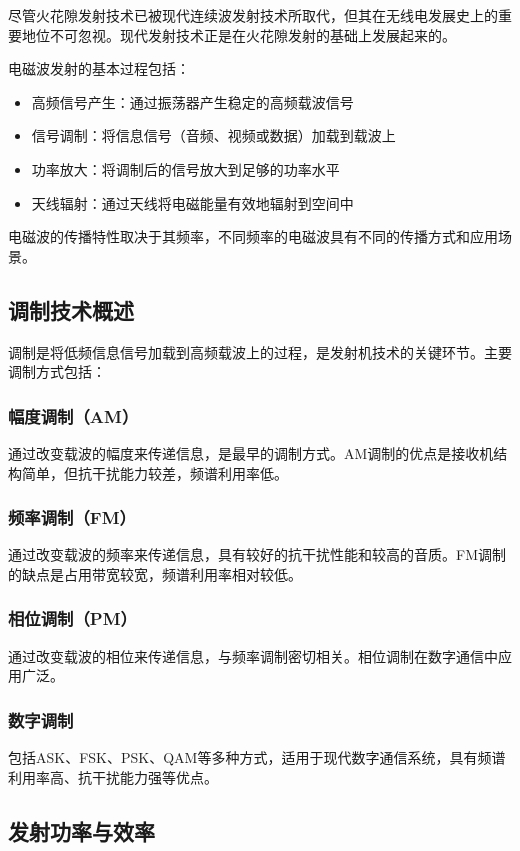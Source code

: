 \documentclass[12pt,UTF8]{ctexbook}
\begin{document}
尽管火花隙发射技术已被现代连续波发射技术所取代，但其在无线电发展史上的重要地位不可忽视。现代发射技术正是在火花隙发射的基础上发展起来的。

电磁波发射的基本过程包括：
\begin{itemize}[leftmargin=3.5em]
    \item 高频信号产生：通过振荡器产生稳定的高频载波信号
    \item 信号调制：将信息信号（音频、视频或数据）加载到载波上
    \item 功率放大：将调制后的信号放大到足够的功率水平
    \item 天线辐射：通过天线将电磁能量有效地辐射到空间中
\end{itemize}

电磁波的传播特性取决于其频率，不同频率的电磁波具有不同的传播方式和应用场景。

\subsection{调制技术概述}

调制是将低频信息信号加载到高频载波上的过程，是发射机技术的关键环节。主要调制方式包括：

\subsubsection{幅度调制（AM）}
通过改变载波的幅度来传递信息，是最早的调制方式。AM调制的优点是接收机结构简单，但抗干扰能力较差，频谱利用率低。

\subsubsection{频率调制（FM）}
通过改变载波的频率来传递信息，具有较好的抗干扰性能和较高的音质。FM调制的缺点是占用带宽较宽，频谱利用率相对较低。

\subsubsection{相位调制（PM）}
通过改变载波的相位来传递信息，与频率调制密切相关。相位调制在数字通信中应用广泛。

\subsubsection{数字调制}
包括ASK、FSK、PSK、QAM等多种方式，适用于现代数字通信系统，具有频谱利用率高、抗干扰能力强等优点。

\subsection{发射功率与效率}
\end{document}
